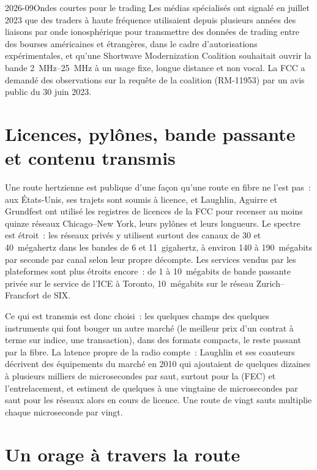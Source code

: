 \begin{dated}{2026-09}{Ondes courtes pour le trading}\label{dat:nw:long-haul-wireless:hf}
Les médias spécialisés ont signalé en juillet 2023 que des traders à haute fréquence utilisaient depuis plusieurs années des liaisons par onde ionosphérique pour transmettre des données de trading entre des bourses américaines et
étrangères, dans le cadre d'autorisations expérimentales, et qu'une Shortwave Modernization Coalition souhaitait ouvrir la bande \qtyrange{2}{25}{\mega\hertz}
à un usage fixe, longue distance et non vocal. La FCC a demandé des observations sur la requête de la coalition (RM-11953) par un avis public du 30 juin 2023.
\end{dated}

\section{Licences, pylônes, bande passante et contenu transmis}

Une route hertzienne est publique d'une façon qu'une route en fibre ne l'est pas~: aux États-Unis, ses trajets sont soumis à licence, et Laughlin, Aguirre et Grundfest ont
utilisé les registres de licences de la FCC pour recenser au moins quinze réseaux Chicago--New York, leurs pylônes et leurs longueurs. Le spectre est étroit~:
les réseaux privés y utilisent surtout des canaux de 30 et 40~mégahertz dans les bandes de 6 et 11~gigahertz, à environ 140 à 190~mégabits par seconde par
canal selon leur propre décompte. Les services vendus par les plateformes sont plus étroits encore~: de 1 à 10~mégabits de bande passante privée sur le service
de l'ICE à Toronto, 10~mégabits sur le réseau Zurich--Francfort de SIX.

Ce qui est transmis est donc choisi~: les quelques champs des quelques instruments qui font bouger un autre marché (le meilleur prix d'un contrat à terme sur indice, une
transaction), dans des formats compacts, le reste passant par la fibre. La latence propre de la radio compte~: Laughlin et ses coauteurs décrivent des équipements
du marché en 2010 qui ajoutaient de quelques dizaines à plusieurs milliers de microsecondes par saut, surtout pour la  (FEC) et l'entrelacement, et estiment de quelques à une vingtaine
de microsecondes par saut pour les réseaux alors en cours de licence. Une route de vingt sauts multiplie chaque microseconde par vingt.

\section{Un orage à travers la route}

